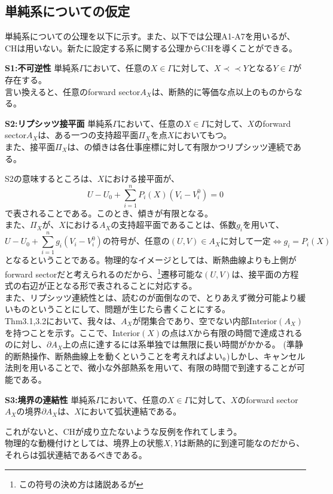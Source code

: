 \documentclass[a4paper,11pt]{jsarticle}
\begin{document}
\subsection{単純系についての仮定}
単純系についての公理を以下に示す。また、以下では公理A1-A7を用いるが、CHは用いない。新たに設定する系に関する公理からCHを導くことができる。\\

\begin{itembox}[l]{\textbf{S1:不可逆性}}
    単純系$\Gamma$において、任意の$X \in \Gamma$に対して、$X \prec \prec Y$となる$Y \in \Gamma$が存在する。\\
    言い換えると、任意のforward sector$A_X$は、断熱的に等価な点以上のものからなる。
\end{itembox}

\begin{itembox}[l]{\textbf{S2:リプシッツ接平面}}
    単純系$\Gamma$において、任意の$X \in \Gamma$に対して、$X$のforward sector$A_X$は、ある一つの支持超平面$\Pi_X$を点$X$においてもつ。\\
    また、接平面$\Pi_X$は、の傾きは各仕事座標に対して有限かつリプシッツ連続である。
\end{itembox}
S2の意味するところは、$X$における接平面が、
\begin{equation}
    U-U_0 +\sum_{i=1}^n P_i(X)(V_i-V_i^0) = 0
\end{equation}
で表されることである。このとき、傾きが有限となる。\\
また、$\Pi_X$が、$X$における$A_X$の支持超平面であることは、係数$g_i$を用いて、
\begin{equation}
    U-U_0 +\sum_{i=1}^n g_i(V_i-V_i^0) の符号が、任意の(U,V)\in A_X に対して一定 \Leftrightarrow g_i = P_i(X)
\end{equation}
となるということである。物理的なイメージとしては、断熱曲線よりも上側がforward sectorだと考えられるのだから、\footnote{この符号の決め方は諸説あるが}遷移可能な$(U,V)$は、接平面の方程式の右辺が正となる形で表されることに対応する。\\
また、リプシッツ連続性とは、読むのが面倒なので、とりあえず微分可能より緩いものということにして、問題が生じたら書くことにする。\\

Thm3.1,3.2において、我々は、$A_X$が閉集合であり、空でない内部$\text{Interior}(A_X)$を持つことを示す。ここで、Interior$(X)$の点は$X$から有限の時間で達成されるのに対し、$\partial A_X$上の点に達するには系単独では無限に長い時間がかかる。
(準静的断熱操作、断熱曲線上を動くということを考えればよい。)しかし、キャンセル法則を用いることで、微小な外部熱系を用いて、有限の時間で到達することが可能である。
\begin{itembox}[l]{\textbf{S3:境界の連結性}}
    単純系$\Gamma$において、任意の$X \in \Gamma$に対して、$X$のforward sector$A_X$の境界$\partial A_X$は、$X$において弧状連結である。
\end{itembox}
これがないと、CHが成り立たないような反例を作れてしまう。\\
物理的な動機付けとしては、境界上の状態$X,Y$は断熱的に到達可能なのだから、それらは弧状連結であるべきである。\\
\end{document}
